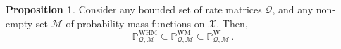 \documentclass[10pt,a4paper]{paper}
\theoremstyle{definition}
\newtheorem{proposition}[theorem]{Proposition}
\newcommand{\states}{\mathcal{X}}
\newcommand{\processes}{\mathbb{P}}
\newcommand{\wprocesses}{\processes^{\mathrm{W}}}
\newcommand{\wmprocesses}{\processes^{\mathrm{WM}}}
\newcommand{\whmprocesses}{\processes^{\mathrm{WHM}}}
\newcommand{\rateset}{\mathcal{Q}}
\begin{document}
\begin{proposition}\label{prop:markov_set_subset_of_nonmarkov_set}
Consider any bounded set of rate matrices $\rateset$, and any non-empty set $\mathcal{M}$ of probability mass functions on $\states$. Then,
\begin{equation*}
\whmprocesses_{\rateset,\mathcal{M}} \subseteq \wmprocesses_{\rateset,\mathcal{M}} \subseteq \wprocesses_{\rateset,\mathcal{M}}\,.
\end{equation*}
\end{proposition}


\end{document}
